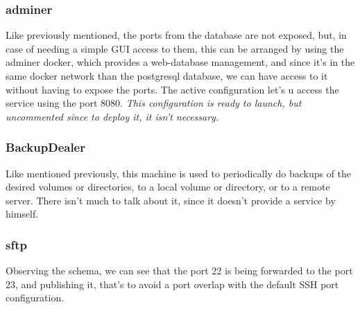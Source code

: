 \documentclass[11pt]{article}
\begin{document}
    \subsubsection[Adminer]{adminer}
    \begin{flushleft}
        Like previously mentioned, the ports from the database are not exposed, but, in case of needing a simple GUI
        access to them, this can be arranged by using the adminer docker, which provides a web-database management,
        and since it's in the same docker network than the postgresql database, we can have access to it without having
        to expose the ports.
        The active configuration let's u access the service using the port 8080.
        \textit{This configuration is ready to launch, but uncommented since to deploy it, it isn't necessary.}
    \end{flushleft}

    \subsubsection[Backup\_dealer]{BackupDealer}
    \begin{flushleft}
       Like mentioned previously, this machine is used to periodically do backups of the desired volumes or directories,
       to a local volume or directory, or to a remote server.
       There isn't much to talk about it, since it doesn't provide a service by himself.
    \end{flushleft}

    \subsubsection[sftp]{sftp}
    \begin{flushleft}
        Observing the schema, we can see that the port 22 is being forwarded to the port 23, and publishing it, that's
        to avoid a port overlap with the default SSH port configuration.
    \end{flushleft}
\end{document}
